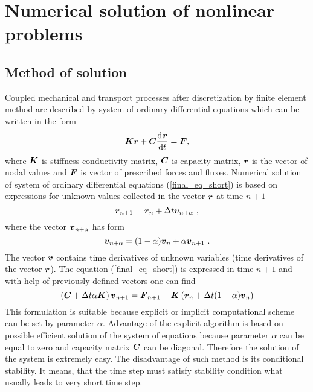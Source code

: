 \chapter{Numerical solution of nonlinear problems}
\label{numsolofnonlin}

\section{Method of solution}

Coupled mechanical and transport processes after discretization by finite element method are described by system of
ordinary differential equations which can be written in the form
\begin{eqnarray}\label{final_eq_short}
\mbox{\boldmath$K$}\mbox{\boldmath$r$} + \mbox{\boldmath$C$} \mbox{$\displaystyle\frac{{\rm d}\>\!{\mbox{\boldmath$r$}}}{{\rm d}{t}}$} = \mbox{\boldmath$F$},
\end{eqnarray}
where $\mbox{\boldmath$K$}$ is stiffness-conductivity matrix, $\mbox{\boldmath$C$}$ is capacity matrix, $\mbox{\boldmath$r$}$ is the vector of nodal values
and $\mbox{\boldmath$F$}$ is vector of prescribed forces and fluxes.
Numerical solution of system of ordinary differential equations (\ref{final_eq_short}) is based on expressions
for unknown values collected in the vector $\mbox{\boldmath$r$}$ at time $n+1$
\begin{equation}\label{defdn}
\mbox{\boldmath$r$}_{n+1} = \mbox{\boldmath$r$}_n + \Delta t \mbox{\boldmath$v$}_{n+\alpha}\ ,
\end{equation}
where the vector $\mbox{\boldmath$v$}_{n+\alpha}$ has form
\begin{equation}\label{defvn}
\mbf{v}_{n+\alpha} = (1-\alpha)\mbf{v}_n + \alpha \mbf{v}_{n+1}\ .
\end{equation}
The vector $\mbox{\boldmath$v$}$ contains time derivatives of unknown variables (time derivatives of the vector $\mbox{\boldmath$r$}$).
The equation (\ref{final_eq_short}) is expressed in time $n+1$ and with help of previously defined vectors
one can find
\begin{equation}\label{diskr}
\left(\mbox{\boldmath$C$} + \Delta t \alpha \mbox{\boldmath$K$}\right)\mbox{\boldmath$v$}_{n+1} = \mbox{\boldmath$F$}_{n+1} -
\mbox{\boldmath$K$}\left(\mbox{\boldmath$r$}_n + \Delta t (1-\alpha)\mbox{\boldmath$v$}_n\right)
\end{equation}
This formulation is suitable because explicit or implicit computational scheme can be set by parameter $\alpha$.
Advantage of the explicit algorithm is based on possible efficient solution of the system of equations because
parameter $\alpha$ can be equal to zero and capacity matrix $\mbox{\boldmath$C$}$ can be diagonal. Therefore the solution
of the system is extremely easy. The disadvantage of such method is its conditional stability. It means, that
the time step must satisfy stability condition what usually leads to very short time step.

